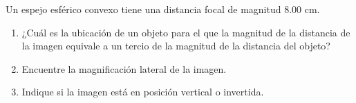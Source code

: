 \item Un espejo esférico convexo tiene una distancia focal de magnitud $8.00\text{ cm}$.
\begin{enumerate}
    \item ¿Cuál es la ubicación de un objeto para el que la magnitud de la distancia de la imagen equivale a un tercio de la magnitud de la distancia del objeto?
    \item Encuentre la magnificación lateral de la imagen.
    \item Indique si la imagen está en posición vertical o invertida.
\end{enumerate}